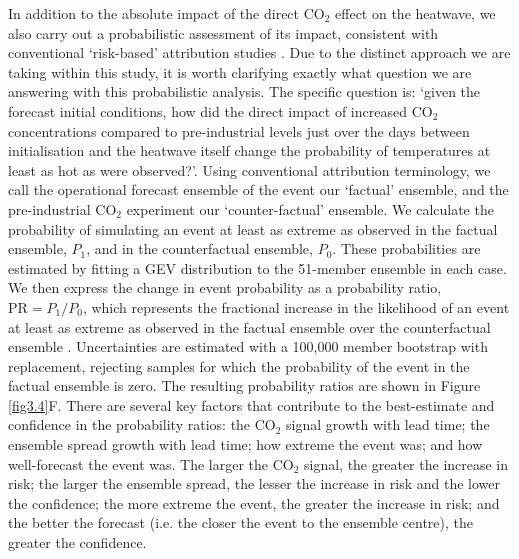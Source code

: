   In addition to the absolute impact of the direct CO$_2$ effect on the heatwave, we also carry out a probabilistic assessment of its impact, consistent with conventional `risk-based' attribution studies \citep{shepherd_common_2016,winsberg_severe_2020}. Due to the distinct approach we are taking within this study, it is worth clarifying exactly what question we are answering with this probabilistic analysis. The specific question is: `given the forecast initial conditions, how did the direct impact of increased CO$_2$ concentrations compared to pre-industrial levels just over the days between initialisation and the heatwave itself change the probability of temperatures at least as hot as were observed?'. Using conventional attribution terminology, we call the operational forecast ensemble of the event our `factual' ensemble, and the pre-industrial CO$_2$ experiment our `counter-factual' ensemble. We calculate the probability of simulating an event at least as extreme as observed in the factual ensemble, $P_1$, and in the counterfactual ensemble, $P_0$. These probabilities are estimated by fitting a GEV distribution to the 51-member ensemble in each case. We then express the change in event probability as a probability ratio, $\text{PR}=P_1/P_0$, which represents the fractional increase in the likelihood of an event at least as extreme as observed in the factual ensemble over the counterfactual ensemble \citep{stott_human_2004,stone_end--end_2005}. Uncertainties are estimated with a 100,000 member bootstrap with replacement, rejecting samples for which the probability of the event in the factual ensemble is zero. The resulting probability ratios are shown in Figure \ref{fig3.4}F. There are several key factors that contribute to the best-estimate and confidence in the probability ratios: the CO$_2$ signal growth with lead time; the ensemble spread growth with lead time; how extreme the event was; and how well-forecast the event was. The larger the CO$_2$ signal, the greater the increase in risk; the larger the ensemble spread, the lesser the increase in risk and the lower the confidence; the more extreme the event, the greater the increase in risk; and the better the forecast (i.e. the closer the event to the ensemble centre), the greater the confidence. 
  
